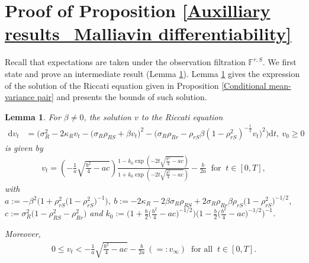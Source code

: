 \documentclass[12,reqno]{amsart}
\numberwithin{equation}{section}
\newtheorem{lemm}[defi]{Lemma}
\begin{document}
\section{Proof of Proposition \ref{Auxilliary results_Malliavin differentiability}}\label{Appendix C}
Recall that expectations are taken under the observation filtration $\mathbb{F}^{r,S}$. We first state and prove an intermediate result (Lemma \ref{Solution of the variance equation}). Lemma \ref{Solution of the variance equation} gives the expression of the solution of the Riccati equation given in Proposition \ref{Conditional mean-variance pair} and presents the bounds of such solution.
\begin{lemm}\label{Solution of the variance equation}
	For $\beta\ne0$, the solution $v$ to the Riccati equation
	\begin{align}\label{Variance equation}
		\mathrm{d}v_{t}&=\Big(\sigma_{R}^{2}-2\kappa_{R}v_{t}-\big(\sigma_{R}\rho_{RS}+\beta v_{t}\big)^{2}-\big(\sigma_{R}\rho_{Rr}-\rho_{rS}\beta (1-\rho_{rS}^{2})^{-\frac{1}{2}}v_{t}\big)^{2}\Big)\mathrm{d}t,~v_{0}\ge0
	\end{align}
	is given by
	\begin{align}\label{Solution of the variance equation_Expression}
		v_{t}=\left(-\frac{1}{a}\sqrt{\frac{b^{2}}{4}-ac}\right)\frac{1-k_{0}\exp\left(-2t\sqrt{\frac{b^{2}}{4}-ac}\right)}{1+k_{0}\exp\left(-2t\sqrt{\frac{b^{2}}{4}-ac}\right)}-\frac{b}{2a}~\text{ for }~t\in[0,T],
	\end{align}
	with $a:=-\beta^{2}\big(1+\rho_{rS}^{2}\big(1-\rho_{rS}^{2}\big)^{-1}\big),~b:=-2\kappa_{R}-2\beta\sigma_{R}\rho_{RS}+2\sigma_{R}\rho_{Rr}\beta\rho_{rS}\big(1-\rho_{rS}^{2}\big)^{-1/2}$, $c:=\sigma_{R}^{2}\big(1-\rho_{RS}^{2}-\rho_{Rr}^{2}\big)$ and $k_{0}:=\big(1+\frac{b}{2}\big(\frac{b^{2}}{4}-ac\big)^{-1/2}\big)\big(1-\frac{b}{2}\big(\frac{b^{2}}{4}-ac\big)^{-1/2}\big)^{-1}$.
	
	Moreover,
	\begin{align}\label{Boundedness of the conditional variance}
		0\le v_{t}<-\frac{1}{a}\sqrt{\frac{b^{2}}{4}-ac}-\frac{b}{2a} ~(=:v_{\infty})~\text{ for all }~t\in[0,T].
	\end{align}
\end{lemm}
\end{document}
